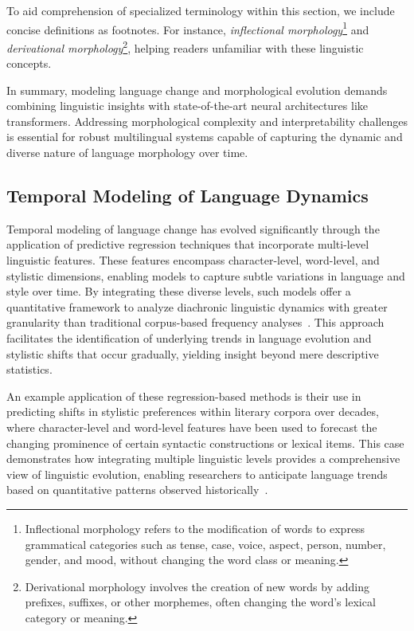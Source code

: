 \documentclass[sigconf]{acmart}
\begin{document}
To aid comprehension of specialized terminology within this section, we include concise definitions as footnotes. For instance, \textit{inflectional morphology}\footnote{Inflectional morphology refers to the modification of words to express grammatical categories such as tense, case, voice, aspect, person, number, gender, and mood, without changing the word class or meaning.} and \textit{derivational morphology}\footnote{Derivational morphology involves the creation of new words by adding prefixes, suffixes, or other morphemes, often changing the word’s lexical category or meaning.}, helping readers unfamiliar with these linguistic concepts.

In summary, modeling language change and morphological evolution demands combining linguistic insights with state-of-the-art neural architectures like transformers. Addressing morphological complexity and interpretability challenges is essential for robust multilingual systems capable of capturing the dynamic and diverse nature of language morphology over time.

\subsection{Temporal Modeling of Language Dynamics}

Temporal modeling of language change has evolved significantly through the application of predictive regression techniques that incorporate multi-level linguistic features. These features encompass character-level, word-level, and stylistic dimensions, enabling models to capture subtle variations in language and style over time. By integrating these diverse levels, such models offer a quantitative framework to analyze diachronic linguistic dynamics with greater granularity than traditional corpus-based frequency analyses~\cite{ref41}. This approach facilitates the identification of underlying trends in language evolution and stylistic shifts that occur gradually, yielding insight beyond mere descriptive statistics.

An example application of these regression-based methods is their use in predicting shifts in stylistic preferences within literary corpora over decades, where character-level and word-level features have been used to forecast the changing prominence of certain syntactic constructions or lexical items. This case demonstrates how integrating multiple linguistic levels provides a comprehensive view of linguistic evolution, enabling researchers to anticipate language trends based on quantitative patterns observed historically~\cite{ref41}.
\end{document}
